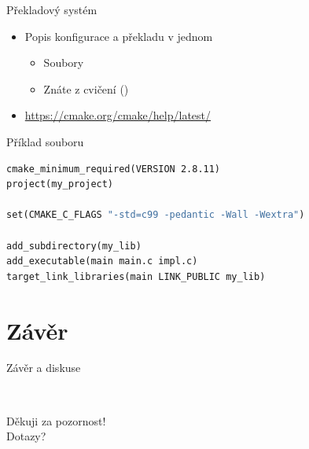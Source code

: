 \begin{frame}[fragile]{Překladový systém \cmake}

  \begin{itemize}
    \item Popis konfigurace a překladu v jednom
    \begin{itemize}
      \item Soubory 
      \item Znáte z cvičení ()
    \end{itemize}

    \pause

    \item \url{https://cmake.org/cmake/help/latest/}
  \end{itemize}

  \pause

  \begin{block}{Příklad souboru }
  \begin{lstlisting}[language=make,columns=fullflexible]
cmake_minimum_required(VERSION 2.8.11)
project(my_project)

set(CMAKE_C_FLAGS "-std=c99 -pedantic -Wall -Wextra")

add_subdirectory(my_lib)
add_executable(main main.c impl.c)
target_link_libraries(main LINK_PUBLIC my_lib)
  \end{lstlisting}
  \end{block}

\end{frame}

\section{Závěr}
\frame{\sectionpage}

\begin{frame}{Závěr a diskuse}

  \begin{center} \Large
     \\[2em]

    \pause \huge

    Děkuji za pozornost! \\[1em]
    Dotazy?
  \end{center}

\end{frame}


